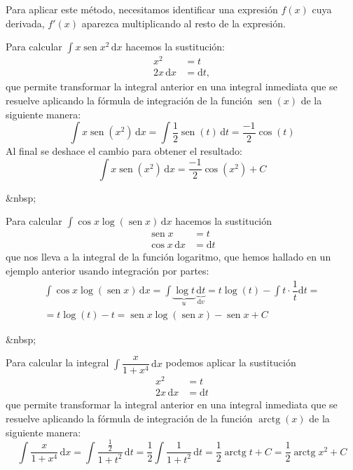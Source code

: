 Para aplicar este método, necesitamos identificar una expresión $f(x)$ cuya derivada, $f'(x)$ aparezca multiplicando al resto de la expresión.
%
\begin{ejemplo}
Para calcular $\displaystyle\int x\operatorname{sen} x^2 \,\mathrm dx$ hacemos la sustitución:
\begin{align*}
x^2      & = t \\
2x\,\mathrm dx   & = \mathrm dt,
\end{align*}
que permite transformar la integral anterior en una integral inmediata que se resuelve aplicando la fórmula de integración de la función $\operatorname{sen}(x)$ de la siguiente manera:
$$
\displaystyle\int x\operatorname{sen}(x^2)\,\mathrm dx = \displaystyle\int \frac{1}{2}\operatorname{sen}(t)\,\mathrm dt = \frac{-1}{2}\cos(t)
$$
Al final se deshace el cambio para obtener el resultado:
\begin{equation}
\displaystyle\int x\operatorname{sen}(x^2)\,\mathrm dx = \frac{-1}{2}\cos(x^2)+C\tag*{\fej}
\end{equation}
\end{ejemplo}
\begin{rawhtml}
&nbsp;
\end{rawhtml}
\begin{ejemplo}
Para calcular $\displaystyle\int\cos x\log(\operatorname{sen} x)\,\mathrm dx$ hacemos la sustitución
\begin{align*}
\operatorname{sen} x     & = t \\
\cos x\,\mathrm dx & = \mathrm dt
\end{align*}
%
que nos lleva a la integral de la función logaritmo, que hemos hallado en un ejemplo anterior usando integración por partes:
\begin{multline*}
\displaystyle\int\cos x\log(\operatorname{sen} x)\,\mathrm dx = \displaystyle\int\underbrace{\log t}_u\,\underbrace{\mathrm dt}_{\mathrm dv}
=t\log(t) - \displaystyle\int t\cdot\dfrac1t\mathrm dt =\\
=t\log(t) - t=
\operatorname{sen} x\log(\operatorname{sen} x) - \operatorname{sen} x + C
\tag*{\fej}
\end{multline*}
\end{ejemplo}
\begin{rawhtml}
&nbsp;
\end{rawhtml}
\begin{ejemplo}
Para calcular la integral $\displaystyle\int\dfrac{x}{1+x^4}\,\mathrm dx$
podemos aplicar la sustitución
%
\begin{align*}
x^2      & = t \\
2x\,\mathrm dx   & = \mathrm dt
\end{align*}
%
que permite transformar la integral anterior en una integral inmediata que se resuelve aplicando la fórmula de integración de la función $\operatorname{arctg}(x)$ de la siguiente manera:
\[
\displaystyle\int\dfrac{x}{1+x^4}\,\mathrm dx = \displaystyle\int\dfrac{\frac{1}{2}}{1+t^2}\,\mathrm dt = \dfrac{1}{2}\displaystyle\int\dfrac{1}{1+t^2}\,\mathrm dt=\dfrac{1}{2}\operatorname{arctg} t +C
= \dfrac{1}{2}\operatorname{arctg} x^2 + C\tag*{\fej}
\]
\end{ejemplo}

